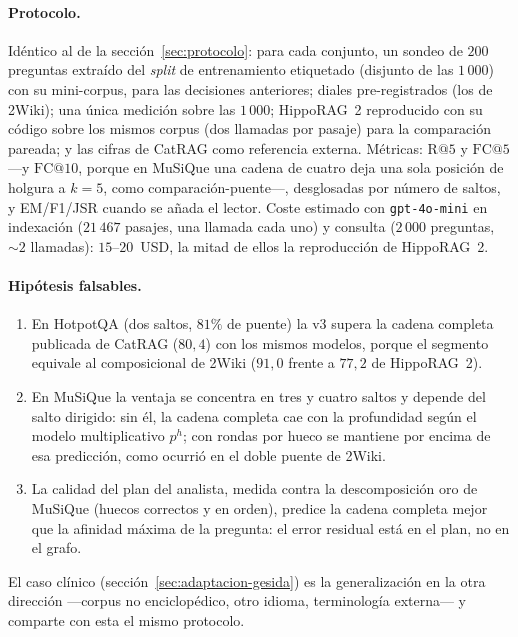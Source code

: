 \documentclass[11pt,a4paper]{article}
\newcommand{\hippo}{HippoRAG~2}
\begin{document}
\paragraph{Protocolo.}
Idéntico al de la sección~\ref{sec:protocolo}: para cada conjunto, un
sondeo de $200$ preguntas extraído del \emph{split} de entrenamiento
etiquetado (disjunto de las $1\,000$) con su mini-corpus, para las
decisiones anteriores; diales pre-registrados (los de 2Wiki); una única
medición sobre las $1\,000$; \hippo{} reproducido con su código sobre los
mismos corpus (dos llamadas por pasaje) para la comparación pareada; y
las cifras de CatRAG como referencia externa. Métricas: $\mathrm{R@}5$ y
$\mathrm{FC@}5$ ---y $\mathrm{FC@}10$, porque en MuSiQue una cadena de
cuatro deja una sola posición de holgura a $k=5$, como
comparación-puente---, desglosadas por número de saltos, y EM/F1/JSR
cuando se añada el lector. Coste estimado con \texttt{gpt-4o-mini} en
indexación ($21\,467$ pasajes, una llamada cada uno) y consulta
($2\,000$ preguntas, $\sim 2$ llamadas): $15$--$20$~USD, la mitad de ellos
la reproducción de \hippo{}.

\paragraph{Hipótesis falsables.}
\begin{enumerate}[leftmargin=1.6em, itemsep=1pt, label=H\arabic*.]
\item En HotpotQA (dos saltos, $81\%$ de puente) la v3 supera la cadena
  completa publicada de CatRAG ($80{,}4$) con los mismos modelos, porque
  el segmento equivale al composicional de 2Wiki ($91{,}0$ frente a
  $77{,}2$ de \hippo{}).
\item En MuSiQue la ventaja se concentra en tres y cuatro saltos y
  depende del salto dirigido: sin él, la cadena completa cae con la
  profundidad según el modelo multiplicativo $p^{h}$; con rondas por
  hueco se mantiene por encima de esa predicción, como ocurrió en el
  doble puente de 2Wiki.
\item La calidad del plan del analista, medida contra la descomposición
  oro de MuSiQue (huecos correctos y en orden), predice la cadena
  completa mejor que la afinidad máxima de la pregunta: el error residual
  está en el plan, no en el grafo.
\end{enumerate}
El caso clínico (sección~\ref{sec:adaptacion-gesida}) es la
generalización en la otra dirección ---corpus no enciclopédico, otro
idioma, terminología externa--- y comparte con esta el mismo protocolo.
\end{document}
